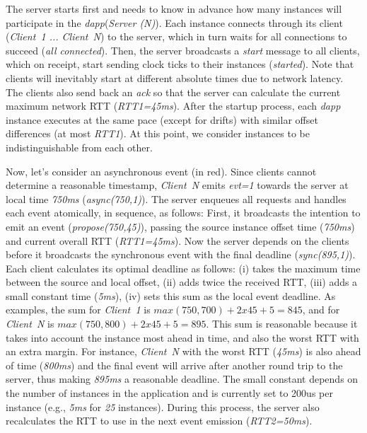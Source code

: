 \documentclass[sigplan,screen]{acmart}
\newcommand{\dapp}{\emph{dapp}\xspace}
\begin{document}
The server starts first and needs to know in advance how many instances will
participate in the \dapp (\emph{Server (N)}).
Each instance connects through its client (\emph{Client~1 ... Client~N}) to the
server, which in turn waits for all connections to succeed
(\emph{all connected}).
Then, the server broadcasts a \emph{start} message to all clients, which on
receipt, start sending clock ticks to their instances (\emph{started}).
Note that clients will inevitably start at different absolute times due to
network latency.
The clients also send back an \emph{ack} so that the server can calculate the
current maximum network RTT (\emph{RTT1=45ms}).
%
After the startup process, each \dapp instance executes at the same pace
(except for drifts) with similar offset differences (at most \emph{RTT1}).
At this point, we consider instances to be indistinguishable from each other.

Now, let's consider an asynchronous event (in red).
%
Since clients cannot determine a reasonable timestamp, \emph{Client~N} emits
\emph{evt=1} towards the server at local time \emph{750ms} (\emph{async(750,1)}).
%
The server enqueues all requests and handles each event atomically, in
sequence, as follows:
%
First, it broadcasts the intention to emit an event (\emph{propose(750,45)}),
passing the source instance offset time (\emph{750ms}) and current overall RTT
(\emph{RTT1=45ms}).
Now the server depends on the clients before it broadcasts the synchronous
event with the final deadline (\emph{sync(895,1)}).
Each client calculates its optimal deadline as follows:
    (i)   takes the maximum time between the source and local offset,
    (ii)  adds twice the received RTT,
    (iii) adds a small constant time (\emph{5ms}),
    (iv)  sets this sum as the local event deadline.
As examples, the sum for
    \emph{Client~1} is $max(750,700)+2x45+5=845$, and for
    \emph{Client~N} is $max(750,800)+2x45+5=895$.
%
This sum is reasonable because it takes into account
    the instance most ahead in time, and also
    the worst RTT with an extra margin.
For instance, \emph{Client~N} with the worst RTT (\emph{45ms}) is also ahead of
time (\emph{800ms}) and the final event will arrive after another round trip to
the server, thus making \emph{895ms} a reasonable deadline.
%
The small constant depends on the number of instances in the application and is
currently set to 200us per instance (e.g., \emph{5ms} for \emph{25} instances).
%
During this process, the server also recalculates the RTT to use in the next
event emission (\emph{RTT2=50ms}).
\end{document}
